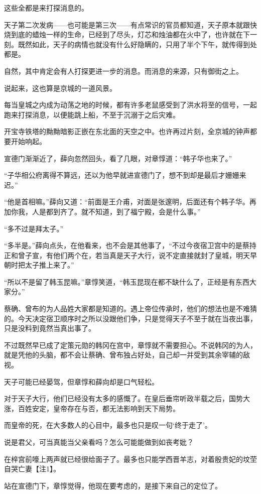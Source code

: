 这些全都是来打探消息的。

天子第二次发病——也可能是第三次——有点常识的官员都知道，天子原本就跟快烧到底的蜡烛一样的生命，已经到了尽头，灯芯和烛油都在火中了，也许就在下一刻。既然如此，天子的病情也就没有什么好隐瞒的，只用了半个下午，就传得到处都是。

自然，其中肯定会有人打探更进一步的消息。而消息的来源，只有御街之上。

说起来，这也算是京城的一道风景。

每当皇城之内成为动荡之地的时候，都有许多老鼠感受到了洪水将至的信号，一起跑来打探消息，以便能跳上船，不至于沉溺于之后灾难。

开宝寺铁塔的黝黝暗影正嵌在东北面的天空之中。也许再过片刻，全京城的钟声都要开始响起。

宣德门渐渐近了，薛向忽然回头，看了几眼，对章惇道：“韩子华也来了。”

“子华相公府离得不算远，还以为他早就进宣德门了，想不到却是最后才姗姗来迟。”

“他是首相嘛。”薛向又道：“前面是王介甫，对面是张邃明，后面还有个韩子华。再加你我，人是都到齐了。就不知道，到了福宁殿，会是什么事。”

“多不过是拜太子。”

“多半是。”薛向点头，在他看来，也不会是其他事了，“不过今夜宿卫宫中的是蔡持正和曾子宣，有他们两个在，若当真是天子大行，说不定直接就封了皇城，明天早朝时把太子推上来了。”

“所以不是留了韩玉昆嘛。”章惇笑道，“韩玉昆现在都不缺什么了，正经是有东西大家分。”

蔡确、曾布的为人品姓大家都是知道的。遇上帝位传承时，他们的想法也是不难猜的。今天决定宿卫顺序时之所以没跟他们争，只是觉得天子不至于就在当夜出事，只是没料到竟然当真出事了。

不过既然早已成了定策元勋的韩冈在宫中，章惇就不需要担心。不说韩冈的为人，就是凭他的头脑，都不会让蔡确、曾布独占好处，自己却一并受到其余宰辅的敌视。

天子可能已经晏驾，但章惇和薛向却是口气轻松。

对于天子大行，他们已经没有太多的感慨了。在皇后垂帘听政半载之后，国势大涨，百姓安定，皇帝存在与否，都无法影响到天下局势。

而皇帝的死，在大多数人的心目中，最多也只是叹一句‘终于走了’。

说是君父，可当真能当父亲看吗？怎么可能能做到如丧考妣？

在梓宫前嚎上两声就已经很给面子了。最多也只能学西晋羊志，对着殷贵妃的坟茔自哭亡妻【注1】。

站在宣德门下，章惇觉得，他现在要考虑的，是接下来自己的定位了。

